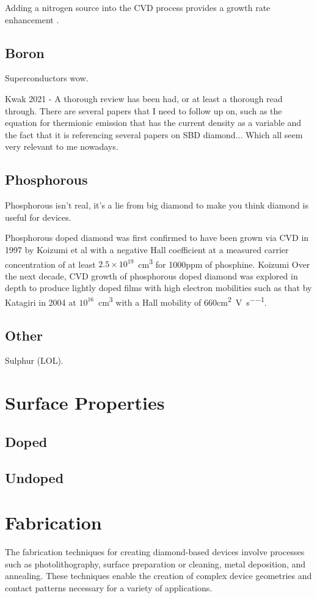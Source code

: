 Adding a nitrogen source into the CVD process provides a growth rate enhancement \cite{dunst2009}.

\subsection{Boron}
Superconductors wow.

Kwak 2021 - A thorough review has been had, or at least a thorough read through. There are several papers that I need to follow up on, such as the equation for thermionic emission that has the current density as a variable and the fact that it is referencing several papers on SBD diamond... Which all seem very relevant to me nowadays.

\subsection{Phosphorous}
\label{subsection:phosphorous_doping}
Phosphorous isn't real, it's a lie from big diamond to make you think diamond is useful for devices.

Phosphorous doped diamond was first confirmed to have been grown via CVD in 1997 by Koizumi et al with a negative Hall coefficient at a measured carrier concentration of at least $2.5\times10^{19}$\si{\per\centi\metre\cubed} for 1000ppm of phosphine. Koizumi  Over the next decade, CVD growth of phosphorous doped diamond was explored in depth to produce lightly doped films with high electron mobilities such as that by Katagiri in 2004 at $10^{16}$\si{\per\centi\metre\cubed} with a Hall mobility of $660$\si{\centi\metre\squared\per\volt\per\second}.
\subsection{Other}
Sulphur (LOL).
\section{Surface Properties}
\subsection{Doped}
\subsection{Undoped}

\section{Fabrication}
 The fabrication techniques for creating diamond-based devices involve processes such as photolithography, surface preparation or cleaning, metal deposition, and annealing. These techniques enable the creation of complex device geometries and contact patterns necessary for a variety of applications.
